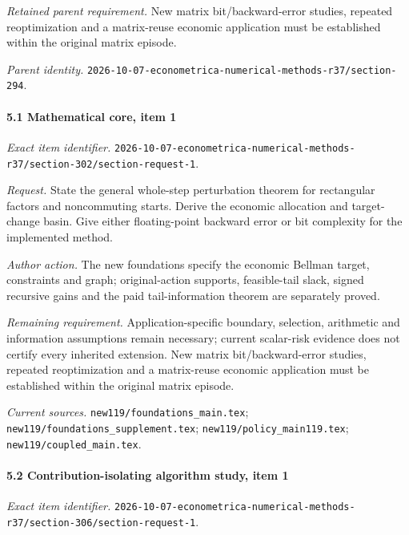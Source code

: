 \par\emph{Retained parent requirement.} New matrix bit/\allowbreak{}backward-error studies, repeated reoptimization and a matrix-reuse economic application must be established within the original matrix episode.

\par\emph{Parent identity.} \nolinkurl{2026-10-07-econometrica-numerical-methods-r37/section-294}.

\paragraph{5.1 Mathematical core, item 1}

\emph{Exact item identifier.} \nolinkurl{2026-10-07-econometrica-numerical-methods-r37/section-302/section-request-1}.

\par\emph{Request.} State the general whole-step perturbation theorem for rectangular factors and noncommuting starts. Derive the economic allocation and target-change basin. Give either floating-point backward error or bit complexity for the implemented method.

\par\emph{Author action.} The new foundations specify the economic Bellman target, constraints and graph; original-action supports, feasible-tail slack, signed recursive gains and the paid tail-information theorem are separately proved.

\par\emph{Remaining requirement.} Application-specific boundary, selection, arithmetic and information assumptions remain necessary; current scalar-risk evidence does not certify every inherited extension. New matrix bit/\allowbreak{}backward-error studies, repeated reoptimization and a matrix-reuse economic application must be established within the original matrix episode.

\par\emph{Current sources.} \nolinkurl{new119/foundations_main.tex}; \nolinkurl{new119/foundations_supplement.tex}; \nolinkurl{new119/policy_main119.tex}; \nolinkurl{new119/coupled_main.tex}.

\paragraph{5.2 Contribution-isolating algorithm study, item 1}

\emph{Exact item identifier.} \nolinkurl{2026-10-07-econometrica-numerical-methods-r37/section-306/section-request-1}.

